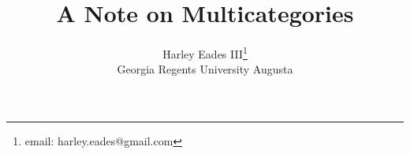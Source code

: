 \documentclass{article}
\title{A Note on Multicategories}
\author{Harley Eades III\footnote{email: harley.eades@gmail.com}\\ Georgia Regents University Augusta}
\date{}
\begin{document}
\maketitle  



\nocite{*}


\end{document}
